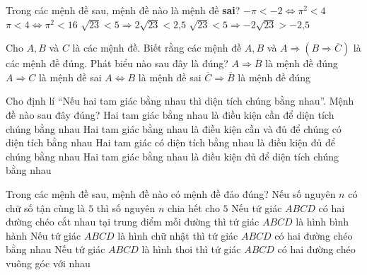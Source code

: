 \begin{ex}%
	Trong các mệnh đề sau, mệnh đề nào  là mệnh đề \textbf{sai}?
	\choice 
		{$-\pi<-2\Leftrightarrow{{\pi}^2}<4$} 
		{$\pi<4\Leftrightarrow{{\pi}^2}<16$} 
		 {$\sqrt{23}<5\Rightarrow 2\sqrt{23}<2\text{,}5$}
		{\True  $\sqrt{23}<5\Rightarrow-2\sqrt{23}>-2\text{,}5$}
\end{ex}

\begin{ex}%
	Cho $A, B$ và $C$ là các mệnh đề. Biết  rằng các mệnh đề $A, B$ và $A \Rightarrow (B \Rightarrow \overline{C})$ là các mệnh đề đúng. Phát biểu nào sau đây là đúng?
	\choice 
		{$A \Rightarrow \overline{B}$ là mệnh  đề đúng}
		{\True $A \Rightarrow {C}$ là mệnh  đề sai}
		{$A \Leftrightarrow B$  là mệnh đề sai}
		{$\overline{C} \Rightarrow \overline{B}$ là mệnh đề đúng} 
\end{ex}

\begin{ex}%
	Cho định lí “Nếu  hai tam giác bằng nhau thì diện tích chúng bằng nhau”. Mệnh đề nào sau đây đúng?
	\choice 
		{Hai tam giác bằng nhau  là điều kiện cần để diện tích chúng bằng nhau}
		{Hai tam giác bằng  nhau là điều kiện cần và đủ để chúng có diện tích bằng nhau}
		{Hai tam giác có diện tích bằng nhau là  điều kiện đủ để chúng bằng nhau}
		{\True Hai tam giác bằng nhau là điều kiện  đủ để diện tích chúng bằng nhau}
\end{ex}

\begin{ex}%
	Trong các mệnh đề sau, mệnh đề nào có mệnh  đề đảo đúng?
	\choice 
		{Nếu  số nguyên $n$ có chữ số tận cùng là $5$ thì số nguyên $n$ chia hết cho $5$}
		{Nếu tứ giác $ABCD$ có hai đường chéo cắt nhau tại trung điểm mỗi  đường thì tứ giác $ABCD$ là hình bình hành}
		{\True Nếu tứ giác $ABCD$ là hình chữ nhật  thì tứ giác $ABCD$ có hai đường chéo bằng nhau}
		{Nếu tứ giác $ABCD$ là hình thoi thì tứ giác $ABCD$ có hai đường chéo vuông góc  với nhau}
\end{ex}

